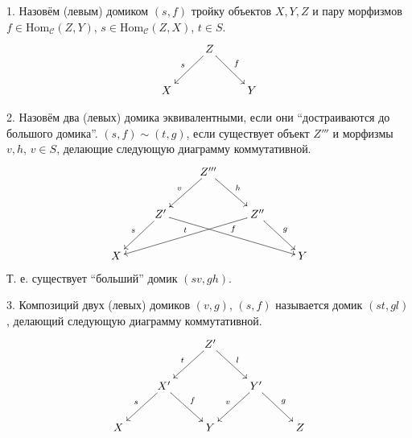 \documentclass[../main.tex]{subfiles}
\begin{document}
     \begin{to_def}
      1. Назовём (левым) домиком $(s, f)$ тройку объектов $X, Y, Z$ и пару морфизмов $f\in \text{Hom}_\mathcal{C}(Z, Y)$, $s \in \text{Hom}_\mathcal{C}(Z, X)$, $t\in S$.
      \begin{equation}\label{sample_home}
	\xymatrix{&Z \ar[ld]_s \ar[rd]^f&\\
	X&&Y}
      \end{equation}

      2. Назовём два (левых) домика эквивалентными, если они ``достраиваются до большого домика''. $(s, f)\sim (t, g)$, если существует объект $Z'''$ и морфизмы $v, h$, $v\in S$, делающие следующую диаграмму коммутативной.
      \begin{equation}\label{home_equivalence}
	\xymatrix{&&Z'''\ar[ld]_v\ar[rd]^h&&\\
	  &Z'\ar[ld]_s\ar[rrrd]^f&&Z''\ar[llld]_t\ar[rd]^g&\\
	X&&&&Y}
      \end{equation}
      Т. е. существует ``больший'' домик $(sv, gh)$.
      \label{homescapes}

      3. Композиций двух (левых) домиков $(v, g)$, $(s, f)$ называется домик $(st, gl)$, делающий следующую диаграмму коммутативной.
	\begin{equation}\label{home_composition}
	\xymatrix{&&Z'\ar[ld]_t\ar[rd]^l&&\\
	  &X'\ar[ld]_s\ar[rd]^f&&Y'\ar[ld]_v\ar[rd]^g&\\
	X&&Y&&Z}
      \end{equation}

    \end{to_def}
\end{document}
